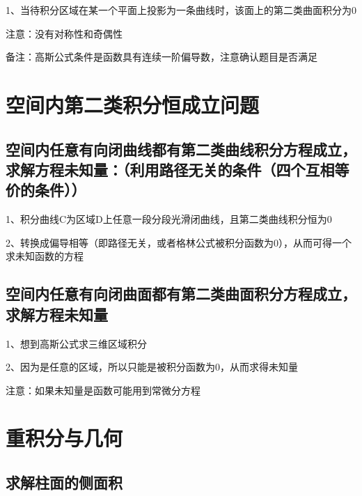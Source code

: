 1、当待积分区域在某一个平面上投影为一条曲线时，该面上的第二类曲面积分为0



注意：没有对称性和奇偶性

备注：高斯公式条件是函数具有连续一阶偏导数，注意确认题目是否满足

\section{空间内第二类积分恒成立问题}



\subsection{空间内任意有向闭曲线都有第二类曲线积分方程成立，求解方程未知量：（利用路径无关的条件（四个互相等价的条件））}

1、积分曲线C为区域D上任意一段分段光滑闭曲线，且第二类曲线积分恒为0

2、转换成偏导相等（即路径无关，或者格林公式被积分函数为0），从而可得一个求未知函数的方程



\subsection{空间内任意有向闭曲面都有第二类曲面积分方程成立，求解方程未知量}

1、想到高斯公式求三维区域积分

2、因为是任意的区域，所以只能是被积分函数为0，从而求得未知量



注意：如果未知量是函数可能用到常微分方程

\section{重积分与几何}



\subsection{求解柱面的侧面积}

